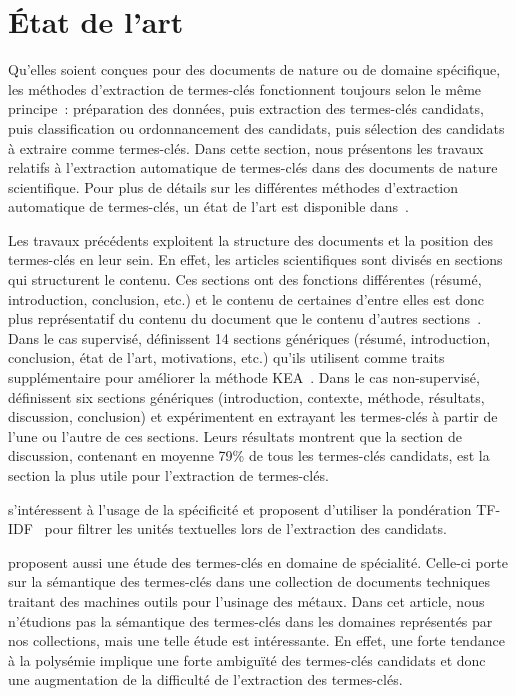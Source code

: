 \section{État de l'art }
\label{sec:etat_de_l_art}
  Qu'elles soient conçues pour des documents de nature ou de domaine spécifique,
  les méthodes d'extraction de termes-clés fonctionnent toujours selon le même
  principe~: préparation des données, puis extraction des termes-clés candidats,
  puis classification ou ordonnancement des candidats, puis sélection des
  candidats à extraire comme termes-clés. Dans cette section, nous présentons
  les travaux relatifs à l'extraction automatique de termes-clés dans des
  documents de nature scientifique. Pour plus de détails sur les différentes
  méthodes d'extraction automatique de termes-clés, un état de l'art est
  disponible dans~\cite{bougouin2013stateoftheart}.

  Les travaux précédents exploitent la structure des documents et la position
  des termes-clés en leur sein. En effet, les articles scientifiques sont
  divisés en sections qui structurent le contenu. Ces sections ont des fonctions
  différentes (résumé, introduction, conclusion, etc.) et le contenu de
  certaines d'entre elles est donc plus représentatif du contenu du document que
  le contenu d'autres sections~\cite{shah2003wherearethekeywords}. Dans le cas
  supervisé,  définissent 14 sections
  génériques (résumé, introduction, conclusion, état de l'art, motivations,
  etc.) qu'ils utilisent comme traits supplémentaire pour améliorer la méthode
  KEA~\cite{witten1999kea}. Dans le cas non-supervisé,
   définissent six sections
  génériques (introduction, contexte, méthode, résultats, discussion,
  conclusion) et expérimentent en extrayant les termes-clés à partir de l'une ou
  l'autre de ces sections. Leurs résultats montrent que la section de
  discussion, contenant en moyenne 79\% de tous les termes-clés candidats, est
  la section la plus utile pour l'extraction de termes-clés.

   s'intéressent à l'usage de la spécificité et
  proposent d'utiliser la pondération TF-IDF~\cite{jones1972tfidf} pour filtrer
  les unités textuelles lors de l'extraction des candidats.

   proposent aussi une étude des
  termes-clés en domaine de spécialité. Celle-ci porte sur la sémantique des
  termes-clés dans une collection de documents techniques traitant des machines
  outils pour l'usinage des métaux. Dans cet article, nous n'étudions pas la
  sémantique des termes-clés dans les domaines représentés par nos collections,
  mais une telle étude est intéressante. En effet, une forte tendance à la
  polysémie implique une forte ambiguïté des termes-clés candidats et donc une
  augmentation de la difficulté de l'extraction des termes-clés.

